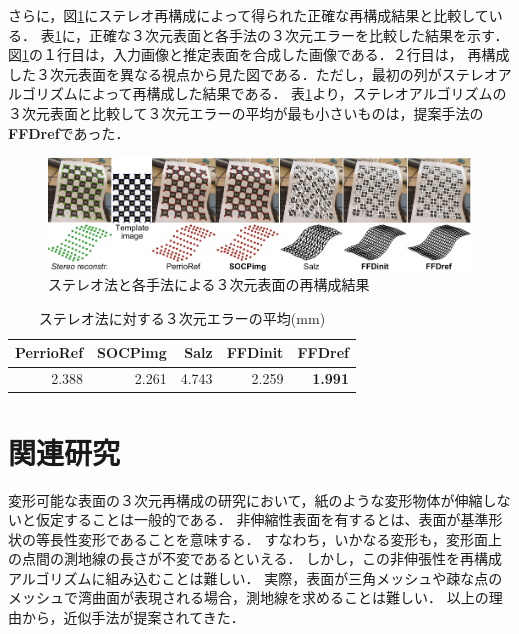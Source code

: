 \documentclass[10.5pt,twocolumn,a4j,fleqn]{ujarticle}
\def\figref#1{図\ref{#1}}
\def\tblref#1{表\ref{#1}}
\begin{document}
さらに，\figref{fig6}にステレオ再構成によって得られた正確な再構成結果と比較している．
\tblref{table4}に，正確な３次元表面と各手法の３次元エラーを比較した結果を示す．
\figref{fig6}の１行目は，入力画像と推定表面を合成した画像である．２行目は，
再構成した３次元表面を異なる視点から見た図である．ただし，最初の列がステレオアルゴリズムによって再構成した結果である．
\tblref{table4}より，ステレオアルゴリズムの３次元表面と比較して３次元エラーの平均が最も小さいものは，提案手法の{\bf FFDref}であった．


\begin{figure}[htbp]
 \begin{center}
  \includegraphics[width=150mm]{img/fig6.png}
  \caption{ステレオ法と各手法による３次元表面の再構成結果}
  \label{fig6}
 \end{center}
\end{figure}

\begin{table}[htb]
  \begin{tabular}{|r|r|r|r|r|} \hline
    PerrioRef & SOCPimg & Salz & FFDinit & FFDref \\ \hline
    2.388 & 2.261 & 4.743 & 2.259 & {\bf 1.991} \\ \hline
  \end{tabular}
  \caption{ステレオ法に対する３次元エラーの平均(mm)}
  \label{table4}
\end{table}

\section{関連研究}
変形可能な表面の３次元再構成の研究において，紙のような変形物体が伸縮しないと仮定することは一般的である．
非伸縮性表面を有するとは、表面が基準形状の等長性変形であることを意味する．
すなわち，いかなる変形も，変形面上の点間の測地線の長さが不変であるといえる．
しかし，この非伸張性を再構成アルゴリズムに組み込むことは難しい．
実際，表面が三角メッシュや疎な点のメッシュで湾曲面が表現される場合，測地線を求めることは難しい．
以上の理由から，近似手法が提案されてきた．
\end{document}
